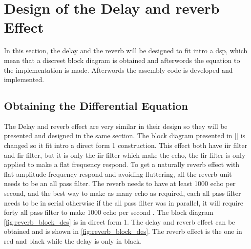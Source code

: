 \section{Design of the Delay and \gls{reverb} Effect}
In this section, the delay and the \gls{reverb} will be designed to fit intro a \gls{dsp}, which mean that a discreet block diagram is obtained and afterwords the equation to the implementation is made. Afterwords the assembly code is developed and implemented. 


\subsection{Obtaining the Differential Equation}
The Delay and \gls{reverb} effect are very similar in their design so they will be presented and designed in the same section. The block diagram presented in \autoref{} is changed so it fit intro a direct form 1 construction. This effect both have \gls{iir} filter and \gls{fir} filter, but it is only the \gls{iir} filter which make the echo, the \gls{fir} filter is only applied to make a flat frequency respond. To get a naturally \gls{reverb} effect with flat amplitude-frequency respond and avoiding fluttering, all the \gls{reverb} unit needs to be an all pass filter. The \gls{reverb} needs to have at least 1000 echo per second, and the best way to make as many echo as required, each all pass filter needs to be in serial otherwise if the all pass filter was in parallel, it will require forty all pass filter to make 1000 echo per second \citep{natural_sounding_revorb}. The block diagram \autoref{fig:reverb_block_des} is in direct form 1. The delay and \gls{reverb} effect can be obtained and is shown in \autoref{fig:reverb_block_des}. The \gls{reverb} effect is the one in red and black while the delay is only in black. 

\newpage

